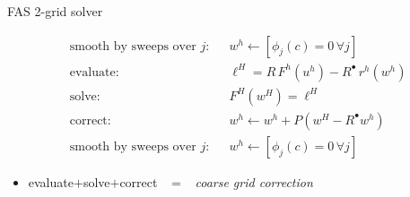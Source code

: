 \documentclass[svgnames,
               hyperref={colorlinks,citecolor=DeepPink4,linkcolor=FireBrick,urlcolor=Maroon},
               usepdftitle=false]  %
               {beamer}
\newcommand{\iR}{R^{\bullet}}
\begin{document}
\begin{frame}{FAS 2-grid solver}

\begin{align*}
&\text{smooth by sweeps over $j$:}  & &w^h \leftarrow \left[\phi_j(c) = 0 \,\forall j\right] \\
&\text{evaluate:}                   & &\ell^H = R\,F^h(u^h) - \iR\, r^h(w^h) \\
&\text{solve:}                       & &F^H(w^H) = \ell^H \\
&\text{correct}:                    & &w^h \leftarrow w^h + P(w^H - \iR w^h) \\
&\text{smooth by sweeps over $j$:}  & &w^h \leftarrow \left[\phi_j(c) = 0 \,\forall j\right]
\end{align*}

\bigskip
\begin{itemize}
\item evaluate$+$solve$+$correct \, $=$ \, \emph{coarse grid correction}
\end{itemize}
\end{frame}
\end{document}
